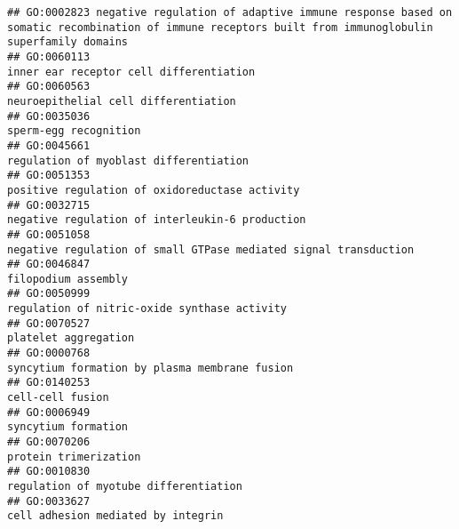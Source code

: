 \documentclass[
]{article}
\begin{document}
\begin{verbatim}
## GO:0002823 negative regulation of adaptive immune response based on somatic recombination of immune receptors built from immunoglobulin superfamily domains
## GO:0060113                                                                                                          inner ear receptor cell differentiation
## GO:0060563                                                                                                             neuroepithelial cell differentiation
## GO:0035036                                                                                                                            sperm-egg recognition
## GO:0045661                                                                                                           regulation of myoblast differentiation
## GO:0051353                                                                                                   positive regulation of oxidoreductase activity
## GO:0032715                                                                                                  negative regulation of interleukin-6 production
## GO:0051058                                                                                 negative regulation of small GTPase mediated signal transduction
## GO:0046847                                                                                                                              filopodium assembly
## GO:0050999                                                                                                     regulation of nitric-oxide synthase activity
## GO:0070527                                                                                                                             platelet aggregation
## GO:0000768                                                                                                    syncytium formation by plasma membrane fusion
## GO:0140253                                                                                                                                 cell-cell fusion
## GO:0006949                                                                                                                              syncytium formation
## GO:0070206                                                                                                                            protein trimerization
## GO:0010830                                                                                                            regulation of myotube differentiation
## GO:0033627                                                                                                               cell adhesion mediated by integrin

\end{verbatim}
\end{document}
